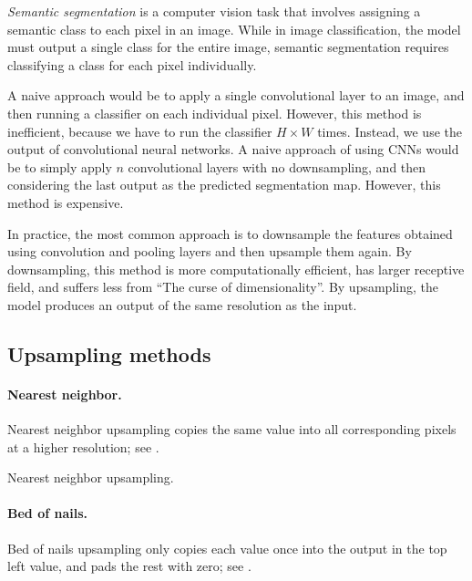 \textit{Semantic segmentation} is a computer vision task that involves assigning a semantic class to
each pixel in an image. While in image classification, the model must output a single class for the
entire image, semantic segmentation requires classifying a class for each pixel individually.

A naive approach would be to apply a single convolutional layer to an image, and then running a
classifier on each individual pixel. However, this method is inefficient, because we have to run
the classifier $H\times W$ times. Instead, we use the output of convolutional neural networks. A
naive approach of using CNNs would be to simply apply $n$ convolutional layers with no
downsampling, and then considering the last output as the predicted segmentation map. However, this
method is expensive.

In practice, the most common approach is to downsample the features obtained using convolution and
pooling layers and then upsample them again. By downsampling, this method is more computationally
efficient, has larger receptive field, and suffers less from ``The curse of dimensionality''. By
upsampling, the model produces an output of the same resolution as the input.

\subsection{Upsampling methods}

\paragraph{Nearest neighbor.}

Nearest neighbor upsampling copies the same value into all corresponding pixels at a higher
resolution; see .

\begin{marginfigure}
    \centering
    \caption{Nearest neighbor upsampling.}
    \label{fig:nearest-neighbor-upsampling}
\end{marginfigure}

\paragraph{Bed of nails.}

Bed of nails upsampling only copies each value once into the output in the top left value, and pads
the rest with zero; see .


